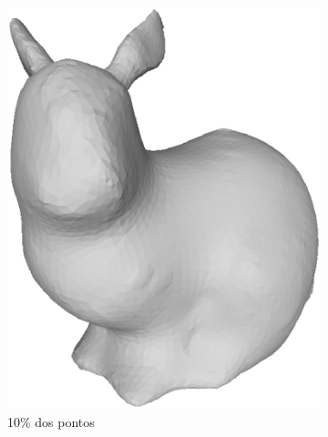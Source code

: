 \begin{figure}[H]
\begin{subfigure}[b]{0.47\textwidth}
	\includegraphics[width=\textwidth]{imagens/cap4/bunny_10.eps}
	\caption{10\% dos pontos}
	\label{fig:ex42}
	\end{subfigure}
	\\
	\begin{subfigure}[b]{0.47\textwidth}
		\centering

\end{subfigure}
\end{figure}
